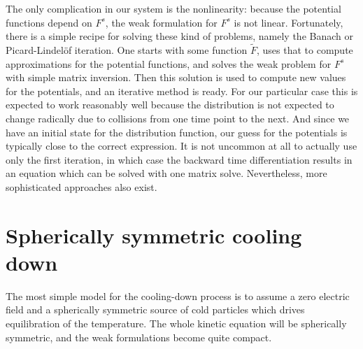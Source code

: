 \documentclass[reprint]{revtex4}
\begin{document}
The only complication in our system is the nonlinearity: because the potential functions depend on $F^s$, the weak formulation for $F^s$ is not linear. Fortunately, there is a simple recipe for solving these kind of problems, namely the Banach or Picard-Lindel\"of iteration. One starts with some function $\tilde{F}$, uses that to compute approximations for the potential functions, and solves the weak problem for $F^s$ with simple matrix inversion. Then this solution is used to compute new values for the potentials, and an iterative method is ready. For our particular case this is expected to work reasonably well because the distribution is not expected to change radically due to collisions from one time point to the next. And since we have an initial state for the distribution function, our guess for the potentials is typically close to the correct expression. It is not uncommon at all to actually use only the first iteration, in which case the backward time differentiation results in an equation which can be solved with one matrix solve. Nevertheless, more sophisticated approaches also exist.

\section{Spherically symmetric cooling down}
The most simple model for the cooling-down process is to assume a zero electric field and a spherically symmetric source of cold particles which drives equilibration of the temperature. The whole kinetic equation will be spherically symmetric, and the weak formulations become quite compact. 
\end{document}
